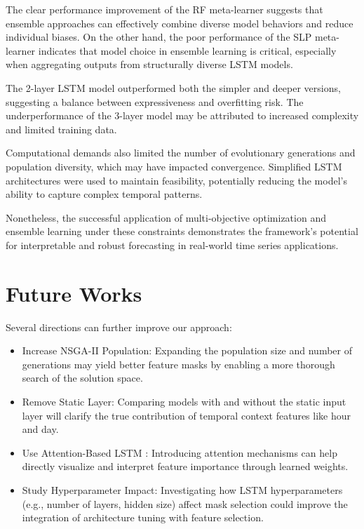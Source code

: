 \documentclass[12pt]{article}
\begin{document}
The clear performance improvement of the RF meta-learner suggests that ensemble approaches can effectively combine diverse model behaviors and reduce individual biases. On the other hand, the poor performance of the SLP meta-learner indicates that model choice in ensemble learning is critical, especially when aggregating outputs from structurally diverse LSTM models.

The 2-layer LSTM model outperformed both the simpler and deeper versions, suggesting a balance between expressiveness and overfitting risk. The underperformance of the 3-layer model may be attributed to increased complexity and limited training data.

Computational demands also limited the number of evolutionary generations and population diversity, which may have impacted convergence. Simplified LSTM architectures were used to maintain feasibility, potentially reducing the model's ability to capture complex temporal patterns.

Nonetheless, the successful application of multi-objective optimization and ensemble learning under these constraints demonstrates the framework’s potential for interpretable and robust forecasting in real-world time series applications.

\section{Future Works}

Several directions can further improve our approach:

\begin{itemize}
    \item Increase NSGA-II Population: Expanding the population size and number of generations may yield better feature masks by enabling a more thorough search of the solution space.

    \item Remove Static Layer: Comparing models with and without the static input layer will clarify the true contribution of temporal context features like hour and day.

    \item Use Attention-Based LSTM \cite{Zhang_2019}: Introducing attention mechanisms can help directly visualize and interpret feature importance through learned weights.

    \item Study Hyperparameter Impact: Investigating how LSTM hyperparameters (e.g., number of layers, hidden size) affect mask selection could improve the integration of architecture tuning with feature selection.
\end{itemize}



\printbibliography
\end{document}
